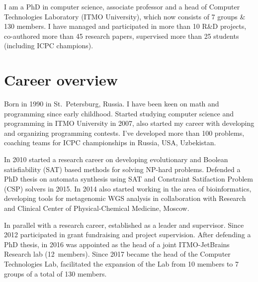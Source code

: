 \documentclass[11pt,a4paper,sans]{moderncv}        %
\begin{document}
\makecvtitle

I am a PhD in computer science, associate professor and a head of Computer Technologies Laboratory (ITMO University),
which now consists of 7 groups \& 130 members.
I have managed and participated in more than 10 R\&D projects, 
co-authored more than 45 research papers, 
supervised more than 25 students (including ICPC champions).
\smallskip



\section{Career overview}
Born in 1990 in St.~Petersburg, Russia. I have been keen on math and programming since early childhood.
Started studying computer science and programming in ITMO University in 2007, also started my career with
developing and organizing programming contests. 
I've developed more than 100 problems, coaching teams for ICPC championships in Russia, USA, Uzbekistan.
\smallskip

In 2010 started a research career on developing evolutionary and 
Boolean satisfiability (SAT) based methods for solving NP-hard problems.
Defended a PhD thesis on automata synthesis using SAT and Constraint Satifaction Problem (CSP) solvers in 2015.
In 2014 also started working in the area of bioinformatics, developing tools 
for metagenomic WGS analysis in collaboration with Research and Clinical Center of Physical-Chemical Medicine, Moscow.
\smallskip

In parallel with a research career, established as a leader and supervisor.
Since 2012 participated in grant fundraising and project supervision.
After defending a PhD thesis, in 2016 was appointed as the head of a joint ITMO-JetBrains Research lab (12~members).
Since 2017 became the head of the Computer Technologies Lab, facilitated the 
expansion of the Lab from 10 members to 7 groups of a total of 130 members.
\end{document}
